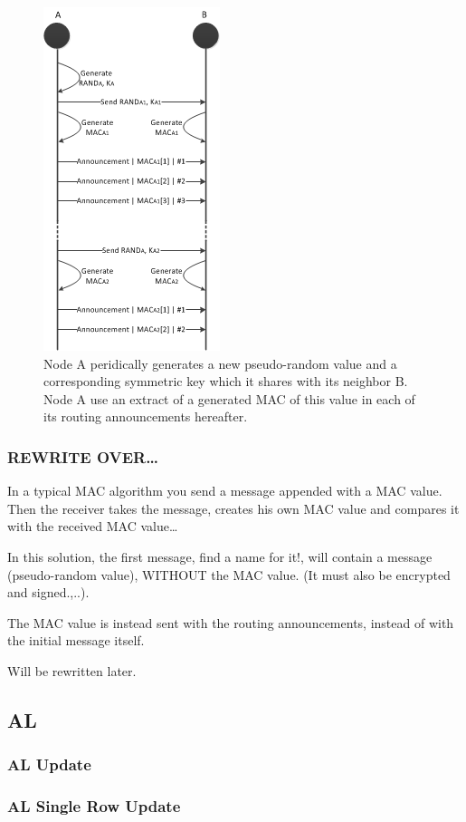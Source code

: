 \begin{figure}[h]
	\centering
  	\includegraphics{images/mac_ogm_msc.png}
  	\caption{Node A peridically generates a new pseudo-random value and a
  	corresponding symmetric key which it shares with its neighbor B. Node A use
  	an extract of a generated MAC of this value in each of its routing
  	announcements hereafter.}
	\label{fig:mac_ogm_msc}
\end{figure}

\subsubsection*{REWRITE OVER\ldots}
In a typical MAC algorithm you send a message appended with a MAC value. Then
the receiver takes the message, creates his own MAC value and compares it with
the received MAC value\ldots 

In this solution, the first message, find a name for it!, will contain a message
(pseudo-random value), WITHOUT the MAC value. (It must also be encrypted and
signed.,..). 

The MAC value is instead sent with the routing announcements, instead of with
the initial message itself.

Will be rewritten later.

\subsection{\acf{AL}}

\subsubsection*{\acf{AL} Update}

\subsubsection*{\acf{AL} Single Row Update}